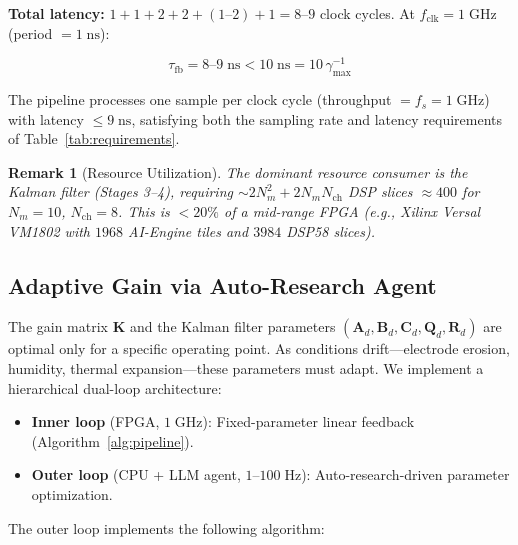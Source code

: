 \documentclass[12pt,twocolumn]{article}
\newtheorem{remark}{Remark}
\newcommand{\kk}{\mathbf{K}}
\begin{document}
\textbf{Total latency:} $1 + 1 + 2 + 2 + (1\text{--}2) + 1 = 8\text{--}9$
clock cycles. At $f_{\mathrm{clk}} = 1\;\mathrm{GHz}$ (period
$= 1\;\mathrm{ns}$):

\begin{equation}
  \tau_{\mathrm{fb}} = 8\text{--}9\;\mathrm{ns}
  < 10\;\mathrm{ns} = 10\,\gamma_{\max}^{-1}
  \label{eq:latency_achieved}
\end{equation}

The pipeline processes one sample per clock cycle (throughput
$= f_s = 1\;\mathrm{GHz}$) with latency $\leq 9\;\mathrm{ns}$,
satisfying both the sampling rate and latency requirements of
Table~\ref{tab:requirements}.

\begin{remark}[Resource Utilization]
The dominant resource consumer is the Kalman filter (Stages 3--4),
requiring $\sim 2 N_m^2 + 2 N_m N_{\mathrm{ch}}$ DSP slices
$\approx 400$ for $N_m = 10$, $N_{\mathrm{ch}} = 8$. This is
$< 20\%$ of a mid-range FPGA (e.g., Xilinx Versal VM1802 with
$1968$ AI-Engine tiles and $3984$ DSP58 slices).
\end{remark}

\subsection{Adaptive Gain via Auto-Research Agent}
\label{sec:fpga:autoresearch}

The gain matrix $\kk$ and the Kalman filter parameters
$(\mathbf{A}_d, \mathbf{B}_d, \mathbf{C}_d, \mathbf{Q}_d, \mathbf{R}_d)$
are optimal only for a specific operating point. As conditions
drift---electrode erosion, humidity, thermal expansion---these
parameters must adapt. We implement a hierarchical dual-loop
architecture:

\begin{itemize}
  \item \textbf{Inner loop} (FPGA, $1\;\mathrm{GHz}$): Fixed-parameter
    linear feedback (Algorithm~\ref{alg:pipeline}).
  \item \textbf{Outer loop} (CPU + LLM agent, $1$--$100\;\mathrm{Hz}$):
    Auto-research-driven parameter optimization.
\end{itemize}

The outer loop implements the following algorithm:
\end{document}
